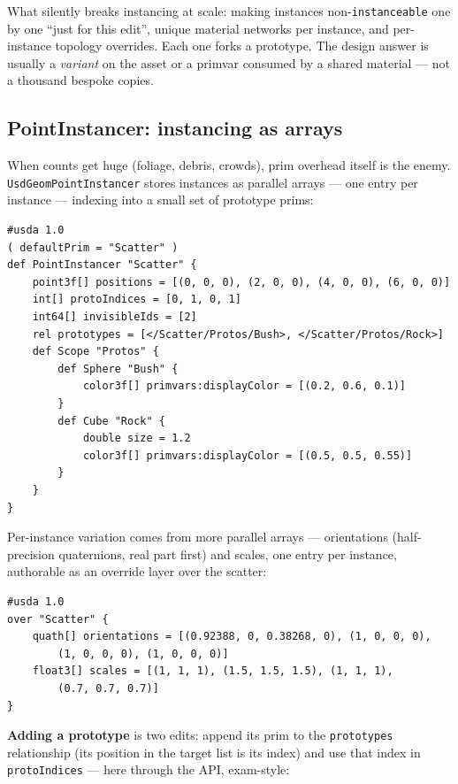 \begin{ExamTip}
What silently breaks instancing at scale: making instances
non-\texttt{instanceable} one by one ``just for this edit'', unique material
networks per instance, and per-instance topology overrides. Each one forks a
prototype. The design answer is usually a \emph{variant} on the asset or a
primvar consumed by a shared material --- not a thousand bespoke copies.
\end{ExamTip}

\subsection{PointInstancer: instancing as arrays}\label{sec:ca-pi}
When counts get huge (foliage, debris, crowds), prim
overhead itself is the enemy. \texttt{UsdGeomPointInstancer} stores instances
as parallel arrays --- one entry per instance --- indexing into a small set
of prototype prims:

\begin{lstlisting}
#usda 1.0
( defaultPrim = "Scatter" )
def PointInstancer "Scatter" {
    point3f[] positions = [(0, 0, 0), (2, 0, 0), (4, 0, 0), (6, 0, 0)]
    int[] protoIndices = [0, 1, 0, 1]
    int64[] invisibleIds = [2]
    rel prototypes = [</Scatter/Protos/Bush>, </Scatter/Protos/Rock>]
    def Scope "Protos" {
        def Sphere "Bush" {
            color3f[] primvars:displayColor = [(0.2, 0.6, 0.1)]
        }
        def Cube "Rock" {
            double size = 1.2
            color3f[] primvars:displayColor = [(0.5, 0.5, 0.55)]
        }
    }
}
\end{lstlisting}

Per-instance variation comes from more parallel arrays --- orientations
(half-precision quaternions, real part first) and scales, one entry per
instance, authorable as an override layer over the scatter:

\begin{lstlisting}
#usda 1.0
over "Scatter" {
    quath[] orientations = [(0.92388, 0, 0.38268, 0), (1, 0, 0, 0),
        (1, 0, 0, 0), (1, 0, 0, 0)]
    float3[] scales = [(1, 1, 1), (1.5, 1.5, 1.5), (1, 1, 1),
        (0.7, 0.7, 0.7)]
}
\end{lstlisting}

\noindent\textbf{Adding a prototype} is two edits: append its prim to the
\texttt{prototypes} relationship (its position in the target list is its
index) and use that index in \texttt{protoIndices} --- here through the API,
exam-style:

